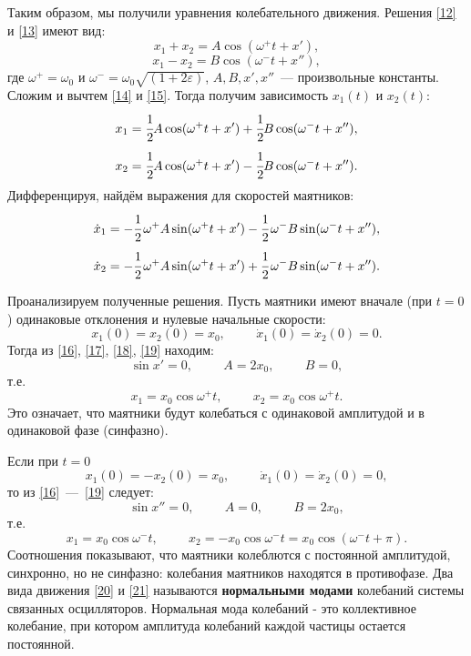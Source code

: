 \documentclass[a4paper,12pt]{article}
\theoremstyle{plain} %
\theoremstyle{definition} %
\theoremstyle{remark} %
\begin{document}
Таким образом, мы получили уравнения колебательного движения. Решения \eqref{12} и \eqref{13} имеют вид:
\begin{equation}
x_1+x_2=A\cos(\omega^{+}t+x'),
\label{14}
\end{equation}
\begin{equation}
x_1-x_2=B\cos(\omega^{-}t+x''),
\label{15}
\end{equation}
где $\omega^+=\omega_0$ и $\omega^-=\omega_0\sqrt{(1+2\varepsilon)}$, $A, B, x', x''$~--- произвольные константы. Сложим и вычтем \eqref{14} и \eqref{15}. Тогда получим зависимость $x_1(t)$ и $x_2(t)$:
\begin{equation}
x_1=\cfrac{1}{2}A\cos(\omega^{+}t+x')+\cfrac{1}{2}B\cos(\omega^{-}t+x''),
\label{16}
\end{equation}
\begin{equation}
x_2=\cfrac{1}{2}A\cos(\omega^{+}t+x')-\cfrac{1}{2}B\cos(\omega^{-}t+x'').
\label{17}
\end{equation}
Дифференцируя, найдём выражения для скоростей маятников:
\begin{equation}
\dot{x}_1=-\cfrac{1}{2}\,\omega^{+}A\sin(\omega^{+}t+x')-\cfrac{1}{2}\,\omega^{-}B\sin(\omega^{-}t+x''),
\label{18}
\end{equation}
\begin{equation}
\dot{x}_2=-\cfrac{1}{2}\,\omega^{+}A\sin(\omega^{+}t+x')+\cfrac{1}{2}\,\omega^{-}B\sin(\omega^{-}t+x'').
\label{19}
\end{equation}

Проанализируем полученные решения. Пусть маятники имеют вначале (при $t = 0$) одинаковые отклонения и нулевые начальные скорости:
$$x_1(0)=x_2(0)=x_0, \hspace{1cm} \dot{x}_1(0)=\dot{x}_2(0)=0.$$
Тогда из \eqref{16}, \eqref{17}, \eqref{18}, \eqref{19} находим:
$$\sin x'=0, \hspace{1cm} A=2x_0,\hspace{1cm} B=0,$$
т.е.
\begin{equation}
x_1=x_0\cos\omega^+t, \hspace{1cm} x_2=x_0\cos\omega^+t.
\label{20}
\end{equation}
Это означает, что маятники будут колебаться с одинаковой амплитудой и в одинаковой фазе (синфазно).

Если при $t = 0$
$$ x_1(0)=-x_2(0)=x_0, \hspace{1cm} \dot{x}_1(0)=\dot{x}_2(0)=0,$$
то из \eqref{16}~---~\eqref{19} следует:
$$\sin x''=0, \hspace{1cm} A=0, \hspace{1cm} B=2x_0,$$
т.е.
\begin{equation}
x_1=x_0\cos\omega^-t, \hspace{1cm} x_2=-x_0\cos\omega^-t=x_0\cos(\omega^-t+\pi).
\label{21}
\end{equation}
Соотношения показывают, что маятники колеблются с постоянной амплитудой, синхронно, но не синфазно: колебания маятников находятся
в противофазе. Два вида движения \eqref{20} и \eqref{21} называются \textbf{нормальными модами} колебаний системы связанных осцилляторов. Нормальная мода колебаний - это коллективное колебание, при котором
амплитуда колебаний каждой частицы остается постоянной.
\end{document}
